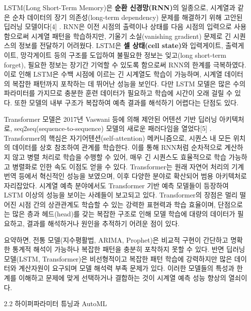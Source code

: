 \documentclass[12pt,ko,a4,]{report}
\begin{document}
LSTM(Long Short-Term Memory)은 \textbf{순환 신경망(RNN)}의 일종으로,
시계열과 같은 순차 데이터의 장기 의존성(long-term dependency) 문제를
해결하기 위해 고안된 딥러닝 모델이다{[}4{]} . RNN은 이전 시점의 출력이나
상태를 다음 시점의 입력으로 사용함으로써 시계열 패턴을 학습하지만,
기울기 소실(vanishing gradient) 문제로 긴 시퀀스의 정보를 전달하기
어려웠다. LSTM은 \textbf{셀 상태(cell state)}와 입력게이트, 출력게이트,
망각게이트 등의 구조를 도입하여 불필요한 정보는 잊고(long short-term
forget), 필요한 정보는 장기간 기억할 수 있도록 함으로써 RNN의 한계를
극복하였다. 이로 인해 LSTM은 수백 시점에 이르는 긴 시계열도 학습이
가능하며, 시계열 데이터의 복잡한 패턴까지 포착하는 데 뛰어난 성능을
보인다. 다만 LSTM 모델은 많은 수의 파라미터를 가지므로 충분한 훈련
데이터가 필요하고 학습에 시간이 오래 걸릴 수 있다. 또한 모델의 내부
구조가 복잡하여 예측 결과를 해석하기 어렵다는 단점도 있다.

Transformer 모델은 2017년 Vaswani 등에 의해 제안된 어텐션 기반 딥러닝
아키텍처로, seq2seq(sequence-to-sequence) 모델의 새로운 패러다임을
열었다{[}5{]} . Transformer의 핵심은 자기어텐션(self-attention)
메커니즘으로, 시퀀스 내 모든 위치의 데이터를 상호 참조하여 관계를
학습한다. 이를 통해 RNN처럼 순차적으로 계산하지 않고 병렬 처리로 학습을
수행할 수 있어, 매우 긴 시퀀스도 효율적으로 학습 가능하고 병렬화로 인한
속도 이점도 얻을 수 있다. Transformer는 원래 자연어 처리의 기계번역
등에서 혁신적인 성능을 보였으며, 이후 다양한 분야로 확산되어 범용
아키텍처로 자리잡았다. 시계열 예측 분야에서도 Transformer 기반 예측
모델들이 등장하여 LSTM 이상의 성능을 보이는 사례들이 보고되고 있다.
Transformer의 장점은 멀리 떨어진 시점 간의 상관관계도 학습할 수 있는
강력한 표현력과 학습 효율이며, 단점으로는 많은 층과 헤드(head)를 갖는
복잡한 구조로 인해 모델 학습에 대량의 데이터가 필요하고, 결과를
해석하거나 원인을 추적하기 어려운 점이 있다.

요약하면, 전통 모델(지수평활법, ARIMA, Prophet)은 비교적 구현이 간단하고
명확한 통계적 해석이 가능하나 복잡한 패턴을 충분히 포착하지 못할 수
있다. 반면 딥러닝 모델(LSTM, Transformer)은 비선형적이고 복잡한 패턴
학습에 강력하지만 많은 데이터와 계산자원이 요구되며 모델 해석력 부족
문제가 있다. 이러한 모델들의 특성과 한계를 이해하고 문제에 맞게
선택하거나 결합하는 것이 시계열 예측 성능 향상의 열쇠이다.

2.2 하이퍼파라미터 튜닝과 AutoML
\end{document}
